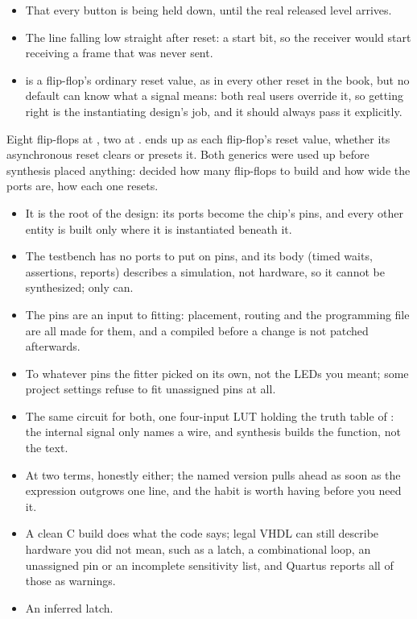 \begin{itemize}
  \item That every button is being held down, until the real released level arrives.
  \item The line falling low straight after reset: a start bit, so the receiver would start
    receiving a frame that was never sent.
  \item {} is a flip-flop's ordinary reset value, as in every other reset in the book, but no
    default can know what a signal means: both real users override it, so getting 
    right is the instantiating design's job, and it should always pass it explicitly.
\end{itemize}
Eight flip-flops at , two at .  ends up as each
flip-flop's reset value, whether its asynchronous reset clears or presets it. Both generics were
used up before synthesis placed anything:  decided how many flip-flops to build and how
wide the ports are,  how each one resets.

\begin{itemize}
  \item It is the root of the design: its ports become the chip's pins, and every other entity is
    built only where it is instantiated beneath it.
  \item The testbench has no ports to put on pins, and its body (timed waits, assertions, reports)
    describes a simulation, not hardware, so it cannot be synthesized; only  can.
\end{itemize}
\begin{itemize}
  \item The pins are an input to fitting: placement, routing and the programming file are all made
    for them, and a  compiled before a change is not patched afterwards.
  \item To whatever pins the fitter picked on its own, not the LEDs you meant; some project settings
    refuse to fit unassigned pins at all.
\end{itemize}
\begin{itemize}
  \item The same circuit for both, one four-input LUT holding the truth table of
    : the internal signal only names a wire, and synthesis builds the function,
    not the text.
  \item At two terms, honestly either; the named version pulls ahead as soon as the expression
    outgrows one line, and the habit is worth having before you need it.
\end{itemize}
\begin{itemize}
  \item A clean C build does what the code says; legal VHDL can still describe hardware you did not
    mean, such as a latch, a combinational loop, an unassigned pin or an incomplete sensitivity list,
    and Quartus reports all of those as warnings.
  \item An inferred latch.
\end{itemize}

